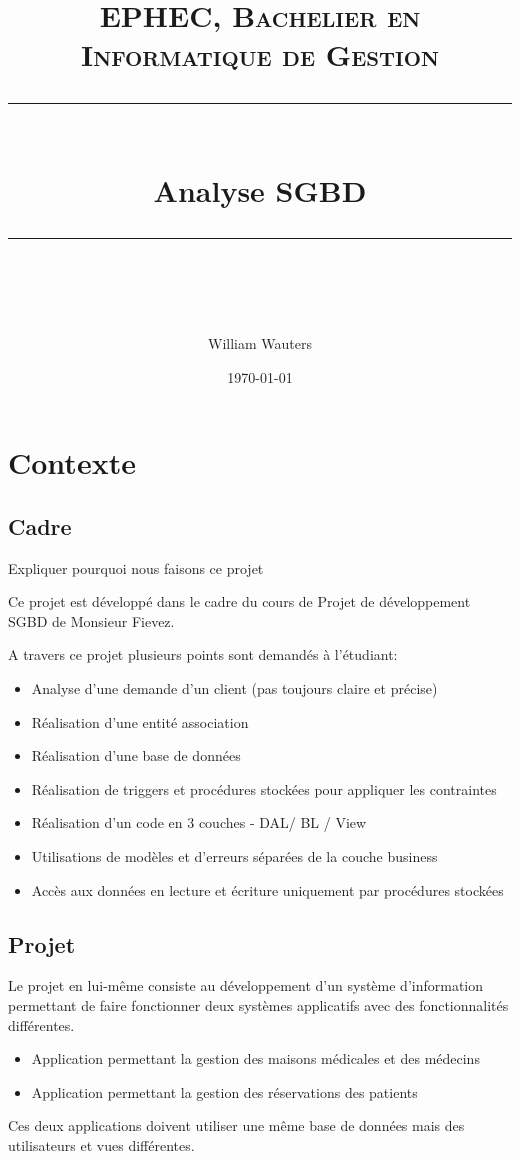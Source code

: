 \documentclass[a4paper,11pt]{article}
\title{	
	\normalfont\normalsize
	\textsc{EPHEC, Bachelier en Informatique de Gestion}\\ %
	\vspace{25pt} %
	\rule{\linewidth}{0.5pt}\\ %
	\vspace{20pt} %
	{\huge Analyse SGBD}\\ %
	\vspace{12pt} %
	\rule{\linewidth}{2pt}\\ %
	\vspace{12pt} %
}
\author{William Wauters} %
\date{\normalsize\today} %
\begin{document}
	\maketitle %
	\newpage
	
	\tableofcontents
	\newpage
	
	\section{Contexte}
	\subsection{Cadre}
	Expliquer pourquoi nous faisons ce projet
	
	Ce projet est développé dans le cadre du cours de Projet de développement SGBD de Monsieur Fievez.
	
	A travers ce projet plusieurs points sont demandés à l'étudiant:
	
	\begin{itemize}
		\item Analyse d'une demande d'un client (pas toujours claire et précise)
		\item Réalisation d'une entité association
		\item Réalisation d'une base de données
		\item Réalisation de triggers et procédures stockées pour appliquer les contraintes
		\item Réalisation d'un code en 3 couches - DAL/ BL / View
		\item Utilisations de modèles et d'erreurs séparées de la couche business
		\item Accès aux données en lecture et écriture uniquement par procédures stockées
	\end{itemize}

	\subsection{Projet}
	Le projet en lui-même consiste au développement d'un système d'information permettant de faire fonctionner deux systèmes applicatifs avec des fonctionnalités différentes.
	\begin{itemize}
		\item Application permettant la gestion des maisons médicales et des médecins
		\item Application permettant la gestion des réservations des patients
	\end{itemize}
	Ces deux applications doivent utiliser une même base de données mais des utilisateurs et vues différentes.
	\newpage
	
\end{document}
